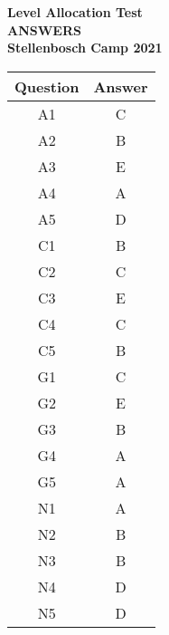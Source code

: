 \documentclass{article}
\begin{document}
\thispagestyle{empty}

\begin{center}
  \textbf{\Large Level Allocation Test}
  \\ \vspace{1em}
  \textbf{\Large ANSWERS}
  \\ \vspace{1em}
  \textbf{\large Stellenbosch Camp 2021}
\end{center}

\vspace{24pt}
\begin{table}[!htb]
    \centering
    \begin{tabular}{| c | c |}
        \hline
        Question & Answer \\
        \hline 
        A1 & C\\
        A2 & B\\
        A3 & E\\
        A4 & A\\
        A5 & D\\
        \hline
        C1 & B\\
        C2 & C\\
        C3 & E\\
        C4 & C\\
        C5 & B\\
        \hline
        G1 & C\\
        G2 & E\\
        G3 & B\\
        G4 & A\\
        G5 & A\\
        \hline
        N1 & A\\
        N2 & B\\
        N3 & B\\
        N4 & D\\
        N5 & D\\ 
        \hline
    \end{tabular}
\end{table}
\end{document}
